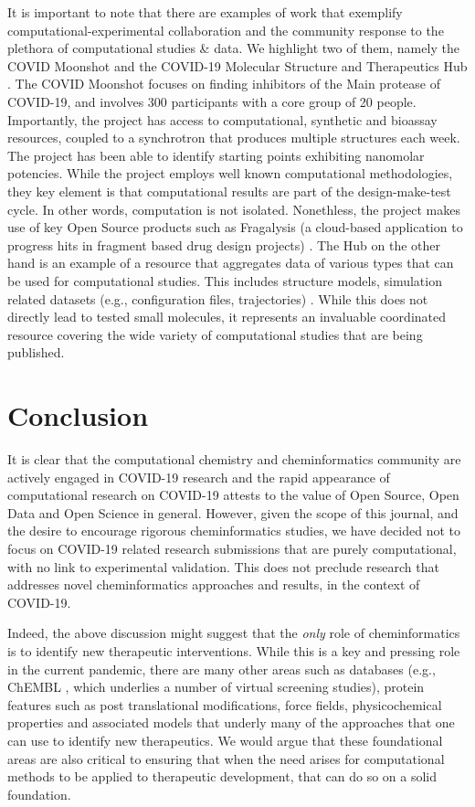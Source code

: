 \documentclass{bmcart}
\begin{document}
It is important to note that there are examples of work that exemplify
computational-experimental collaboration and the community response to
the plethora of computational studies \& data. We highlight two of
them, namely the COVID Moonshot \cite{moonshot} and the COVID-19
Molecular Structure and Therapeutics Hub \cite{molssi}. The COVID
Moonshot focuses on finding inhibitors of the Main protease of
COVID-19, and involves 300 participants with a core group of 20
people. Importantly, the project has access to computational,
synthetic and bioassay resources, coupled to a synchrotron that
produces multiple structures each week. The project has been able to
identify starting points exhibiting nanomolar potencies. While the
project employs well known computational methodologies, they key
element is that computational results are part of the design-make-test
cycle. In other words, computation is not isolated. Nonethless, the
project makes use of key Open Source products such as Fragalysis (a
cloud-based application to progress hits in fragment based drug design
projects) \cite{fragalysis}. The Hub on the other hand is an example of a resource that
aggregates data of various types that can be used for computational
studies. This includes structure models, simulation related datasets
(e.g., configuration files, trajectories) . While this does not
directly lead to tested small molecules, it represents an invaluable
coordinated resource covering the wide variety of computational
studies that are being published.


\section*{Conclusion}

It is clear that the computational chemistry and cheminformatics
community are actively engaged in COVID-19 research and the rapid
appearance of computational research \cite{jcim_covid_editorial} on
COVID-19 attests to the value of Open Source, Open Data and Open
Science in general. However, given the scope of this journal, and the
desire to encourage rigorous cheminformatics studies, we have decided
not to focus on COVID-19 related research submissions that are purely
computational, with no link to experimental validation. This does not
preclude research that addresses novel cheminformatics approaches and
results, in the context of COVID-19.

Indeed, the above discussion might suggest that the \emph{only} role
of cheminformatics is to identify new therapeutic interventions. While
this is a key and pressing role in the current pandemic, there are
many other areas such as databases (e.g., ChEMBL \cite{chembl}, which
underlies a number of virtual screening studies), protein features
such as post translational modifications, force fields,
physicochemical properties and associated models that underly many of
the approaches that one can use to identify new therapeutics. We would
argue that these foundational areas are also critical to ensuring that
when the need arises for computational methods to be applied to
therapeutic development, that can do so on a solid foundation.
\end{document}
